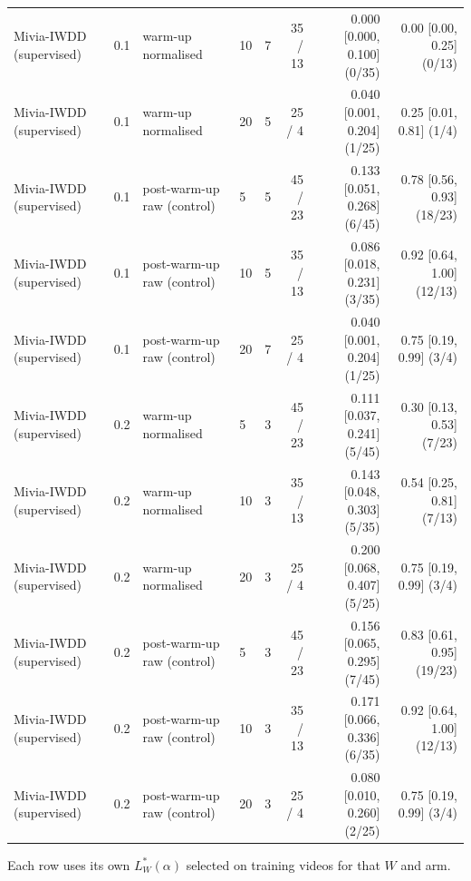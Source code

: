 \begin{table}[t]
{\begin{tabular}{llllrrrr}
Mivia-IWDD (supervised) & 0.1 & warm-up normalised & 10 & 7 & 35 / 13 & 0.000 [0.000, 0.100] (0/35) & 0.00 [0.00, 0.25] (0/13) \\
Mivia-IWDD (supervised) & 0.1 & warm-up normalised & 20 & 5 & 25 / 4 & 0.040 [0.001, 0.204] (1/25) & 0.25 [0.01, 0.81] (1/4) \\
Mivia-IWDD (supervised) & 0.1 & post-warm-up raw (control) & 5 & 5 & 45 / 23 & 0.133 [0.051, 0.268] (6/45) & 0.78 [0.56, 0.93] (18/23) \\
Mivia-IWDD (supervised) & 0.1 & post-warm-up raw (control) & 10 & 5 & 35 / 13 & 0.086 [0.018, 0.231] (3/35) & 0.92 [0.64, 1.00] (12/13) \\
Mivia-IWDD (supervised) & 0.1 & post-warm-up raw (control) & 20 & 7 & 25 / 4 & 0.040 [0.001, 0.204] (1/25) & 0.75 [0.19, 0.99] (3/4) \\
Mivia-IWDD (supervised) & 0.2 & warm-up normalised & 5 & 3 & 45 / 23 & 0.111 [0.037, 0.241] (5/45) & 0.30 [0.13, 0.53] (7/23) \\
Mivia-IWDD (supervised) & 0.2 & warm-up normalised & 10 & 3 & 35 / 13 & 0.143 [0.048, 0.303] (5/35) & 0.54 [0.25, 0.81] (7/13) \\
Mivia-IWDD (supervised) & 0.2 & warm-up normalised & 20 & 3 & 25 / 4 & 0.200 [0.068, 0.407] (5/25) & 0.75 [0.19, 0.99] (3/4) \\
Mivia-IWDD (supervised) & 0.2 & post-warm-up raw (control) & 5 & 3 & 45 / 23 & 0.156 [0.065, 0.295] (7/45) & 0.83 [0.61, 0.95] (19/23) \\
Mivia-IWDD (supervised) & 0.2 & post-warm-up raw (control) & 10 & 3 & 35 / 13 & 0.171 [0.066, 0.336] (6/35) & 0.92 [0.64, 1.00] (12/13) \\
Mivia-IWDD (supervised) & 0.2 & post-warm-up raw (control) & 20 & 3 & 25 / 4 & 0.080 [0.010, 0.260] (2/25) & 0.75 [0.19, 0.99] (3/4) \\
\bottomrule
\end{tabular}}
\begin{minipage}{\linewidth}\vspace{2pt}\footnotesize Each row uses its own $L^\ast_W(\alpha)$ selected on training videos for that $W$ and arm.\end{minipage}
\end{table}
